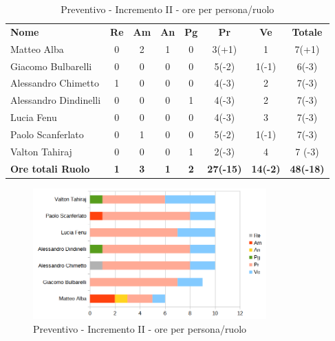 \begin{table} [h!]
	\begin{center}
		\begin{tabular} { m{3.5cm} c c c c c c c }
			\rowcolor{lightgray}
			\textbf{Nome} & \textbf{Re} & \textbf{Am} & \textbf{An} & \textbf{Pg} & \textbf{Pr} & \textbf{Ve} & \textbf{Totale} \\
			Matteo Alba & 0 & 2 & 1 & 0 & 3(+1) & 1 & 7(+1) \\
			Giacomo Bulbarelli & 0 & 0 & 0 & 0 & 5(-2) & 1(-1) & 6(-3) \\
			Alessandro Chimetto & 1 & 0 & 0 & 0 & 4(-3) & 2 & 7(-3) \\
			Alessandro Dindinelli & 0 & 0 & 0 & 1 & 4(-3) & 2 & 7(-3) \\
			Lucia Fenu & 0 & 0 & 0 & 0 & 4(-3) & 3 & 7(-3) \\
			Paolo Scanferlato & 0 & 1 & 0 & 0 & 5(-2) & 1(-1) & 7(-3) \\
			Valton Tahiraj & 0 & 0 & 0 & 1 & 2(-3) & 4 & 7 (-3)\\
			\textbf{Ore totali Ruolo} & \textbf{1} & \textbf{3} & \textbf{1} & \textbf{2} & \textbf{27(-15)}& \textbf{14(-2)} & \textbf{48(-18)}
		\end{tabular}
		\caption{Preventivo - Incremento II - ore per persona/ruolo}
	\end{center}
\end{table}
\begin{figure} [h!]
	\centering
	\includegraphics[width=0.8\textwidth]{res/img/grafici/consuntivo-barre- incremento2.png}
	\caption{Preventivo - Incremento II - ore per persona/ruolo} 
\end{figure}

\newpage

